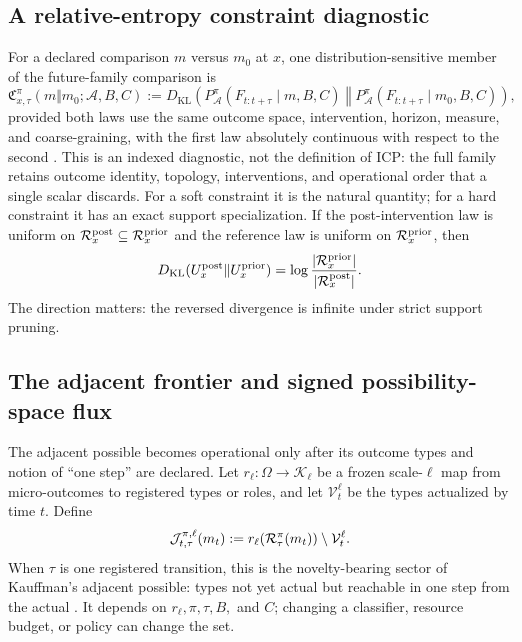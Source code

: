 \subsection{A relative-entropy constraint diagnostic}

For a declared comparison $m$ versus $m_0$ at $x$, one distribution-sensitive
member of the future-family comparison is
\begin{equation}
 \mathfrak C_{x,\tau}^{\pi}
 (m\Vert m_0;\mathcal A,B,C)
 :=D_{\mathrm{KL}}\!\left(
 P^{\pi}_{\mathcal A}(F_{t:t+\tau}\mid m,B,C)
 \middle\Vert
 P^{\pi}_{\mathcal A}(F_{t:t+\tau}\mid m_0,B,C)
 \right),
 \label{eq:icp-constraint-divergence}
\end{equation}
provided both laws use the same outcome space, intervention, horizon, measure,
and coarse-graining, with the first law absolutely continuous with respect to
the second \citep{KullbackLeibler1951Information}. This is an indexed
diagnostic, not the definition of ICP: the full family retains outcome
identity, topology, interventions, and operational order that a single scalar
discards. For a soft constraint it is the natural quantity; for a hard
constraint it has an exact support specialization. If the post-intervention
law is uniform on $\mathcal{R}_x^{\mathrm{post}}\subseteq\mathcal{R}_x^{\mathrm{prior}}$
and the reference law is uniform on $\mathcal{R}_x^{\mathrm{prior}}$, then
\begin{equation}
 D_{\mathrm{KL}}(U_x^{\mathrm{post}}\Vert U_x^{\mathrm{prior}})
 =\log\frac{|\mathcal{R}_x^{\mathrm{prior}}|}{|\mathcal{R}_x^{\mathrm{post}}|}.
 \label{eq:iota-kl-identity}
\end{equation}
The direction matters: the reversed divergence is infinite under strict
support pruning.

\subsection{The adjacent frontier and signed possibility-space flux}

The adjacent possible becomes operational only after its outcome types and
notion of ``one step'' are declared. Let $r_\ell:\Omega\rightarrow\mathcal
K_\ell$ be a frozen scale-$\ell$ map from micro-outcomes to registered types or
roles, and let $\mathcal V_t^\ell$ be the types actualized by time $t$. Define
\begin{equation}
 \mathcal J_{t,\tau}^{\pi,\ell}(m_t)
 :=r_\ell\!\left(\mathcal{R}_\tau^\pi(m_t)\right)\setminus\mathcal V_t^\ell .
 \label{eq:adjacent-frontier}
\end{equation}
When $\tau$ is one registered transition, this is the novelty-bearing sector of
Kauffman's adjacent possible: types not yet actual but reachable in one step
from the actual \citep[p.~142]{Kauffman2000Investigations}. It depends on
$r_\ell,\pi,\tau,B,$ and $C$; changing a classifier, resource budget, or policy
can change the set.


